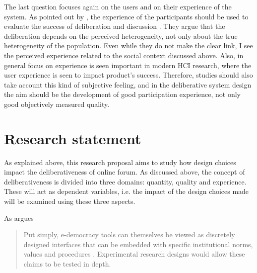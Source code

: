 \documentclass{article}
\begin{document}
The last question focuses again on the users and on their experience of the system. As pointed out by , the experience of the participants should be used to evaluate the success of deliberation and discussion . They argue that the deliberation depends on the perceived heterogeneity, not only about the true heterogeneity of the population. Even while they do not make the clear link, I see the perceived experience related to the social context discussed above. Also, in general focus on experience is seen important in modern HCI research, where the user experience is seen to impact product's success. Therefore, studies should also take account this kind of subjective feeling, and in the deliberative system design the aim should be the development of good participation experience, not only good objectively measured quality.


\section{Research statement}

As explained above, this research proposal aims to study how design choices impact the deliberativeness of online forum. As discussed above, the concept of deliberativeness is divided into three domains: quantity, quality and experience. These will act as dependent variables, i.e. the impact of the design choices made will be examined using these three aspects.


As  argues

\begin{quote}
Put simply, e-democracy tools can themselves be viewed as discretely designed interfaces that can be embedded with specific institutional norms, values and procedures \cite{wright07}. Experimental research designs would allow these claims to be tested in depth.
\end{quote}
\end{document}
